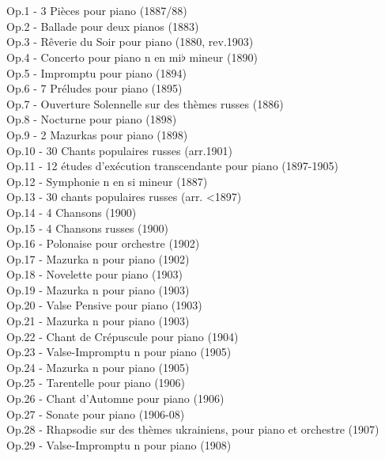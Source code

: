 \\
\\
Op.1 - 3 Pièces pour piano (1887/88)\\
Op.2 - Ballade pour deux pianos (1883)\\
Op.3 - Rêverie du Soir pour piano (1880, rev.1903)\\
Op.4 - Concerto pour piano n en mi$\flat$ mineur (1890)\\
Op.5 - Impromptu pour piano (1894)\\
Op.6 - 7 Préludes pour piano (1895)\\
Op.7 - Ouverture Solennelle sur des thèmes russes (1886)\\
Op.8 - Nocturne pour piano (1898)\\
Op.9 - 2 Mazurkas pour piano (1898)\\
Op.10 - 30 Chants populaires russes (arr.1901)\\
Op.11 - 12 études d'exécution transcendante pour piano (1897-1905)\\
Op.12 - Symphonie n en si mineur (1887)\\
Op.13 - 30 chants populaires russes (arr. <1897)\\
Op.14 - 4 Chansons (1900)\\
Op.15 - 4 Chansons russes (1900)\\
Op.16 - Polonaise pour orchestre (1902)\\
Op.17 - Mazurka n pour piano (1902)\\
Op.18 - Novelette pour piano (1903)\\
Op.19 - Mazurka n pour piano (1903)\\
Op.20 - Valse Pensive pour piano (1903)\\
Op.21 - Mazurka n pour piano (1903)\\
Op.22 - Chant de Crépuscule pour piano (1904)\\
Op.23 - Valse-Impromptu n pour piano (1905)\\
Op.24 - Mazurka n pour piano (1905)\\
Op.25 - Tarentelle pour piano (1906)\\
Op.26 - Chant d'Automne pour piano (1906)\\
Op.27 - Sonate pour piano (1906-08)\\
Op.28 - Rhapsodie sur des thèmes ukrainiens, pour piano et orchestre (1907)\\
Op.29 - Valse-Impromptu n pour piano (1908)\\
